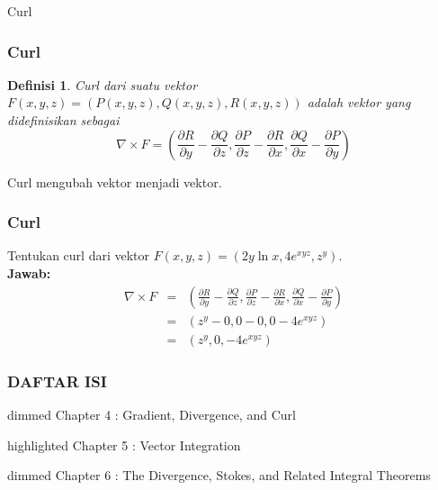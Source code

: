 \documentclass[10pt]{beamer}
\newtheorem{definisi}{Definisi}
\begin{document}
\begin{frame}{Curl}
    \frametitle{Curl}
    \begin{definisi}
        Curl dari suatu vektor $F(x,y,z) = (P(x,y,z), Q(x,y,z), R(x,y,z))$ adalah vektor yang didefinisikan sebagai
        \begin{equation}
            \nabla \times F = \left(\frac{\partial R}{\partial y} - \frac{\partial Q}{\partial z}, \frac{\partial P}{\partial z} - \frac{\partial R}{\partial x}, \frac{\partial Q}{\partial x} - \frac{\partial P}{\partial y}\right)
        \end{equation}
    \end{definisi}
    Curl mengubah vektor menjadi vektor.
\end{frame}

\begin{frame}
    \frametitle{Curl}
    \begin{example}
        Tentukan curl dari vektor $F(x,y,z) = (2y \ln x,4e^{xyz}, z^y )$.\\
        \textbf{Jawab:}
        \begin{eqnarray*}
            \nabla \times F &=& \left(\frac{\partial R}{\partial y} - \frac{\partial Q}{\partial z}, \frac{\partial P}{\partial z} - \frac{\partial R}{\partial x}, \frac{\partial Q}{\partial x} - \frac{\partial P}{\partial y}\right)\\
            &=& (z^y - 0, 0 - 0, 0 - 4e^{xyz})\\
            &=& (z^y, 0, -4e^{xyz})
        \end{eqnarray*}
    \end{example}
\end{frame}

\begin{frame} 
\frametitle{DAFTAR ISI}
    \begin{beamercolorbox}
        [wd=\textwidth,rounded=true,shadow=true]{dimmed}
        Chapter 4 : Gradient, Divergence, and Curl
    \end{beamercolorbox} 
    \vspace{2ex}
    \begin{beamercolorbox}
        [wd=\textwidth,rounded=true,shadow=true]{highlighted}
        Chapter 5 : Vector Integration
    \end{beamercolorbox}
    \vspace{2ex}
    \begin{beamercolorbox}
        [wd=\textwidth,rounded=true,shadow=true]{dimmed}
        Chapter 6 : The Divergence, Stokes, and Related Integral Theorems
    \end{beamercolorbox}
    \vspace{2ex}   
   \end{frame}
\end{document}
